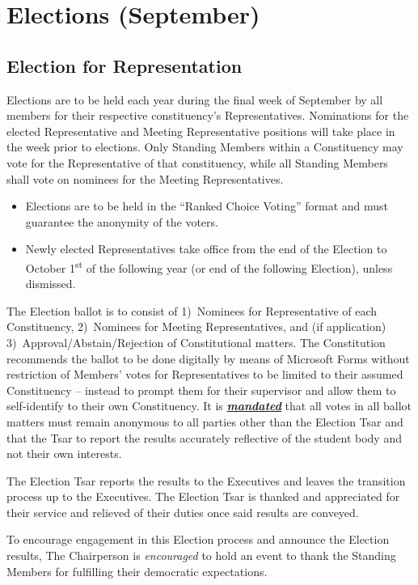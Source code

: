\documentclass[8pt]{article}
\begin{document}
	\section{Elections (September)}
	\subsection{Election for Representation}\label{sec:elections}
	Elections are to be held each year during the final week of September by all members for their respective constituency's Representatives. Nominations for the elected Representative and Meeting Representative positions will take place in the week prior to elections. Only Standing Members within a Constituency may vote for the Representative of that constituency, while all Standing Members shall vote on nominees for the Meeting Representatives. 
	\begin{itemize}	
		\item Elections are to be held in the ``Ranked Choice Voting'' format and must guarantee the anonymity of the voters. 
		\item Newly elected Representatives take office from the end of the Election to October 1\textsuperscript{st} of the following year (or end of the following Election), unless dismissed.
	\end{itemize}
	The Election ballot is to consist of 1)~Nominees for Representative of each Constituency, 2)~Nominees for Meeting Representatives, and (if application) 3)~Approval/Abstain/Rejection of Constitutional matters. The Constitution recommends the ballot to be done digitally by means of Microsoft Forms without restriction of Members' votes for Representatives to be limited to their assumed Constituency -- instead to prompt them for their supervisor and allow them to self-identify to their own Constituency. It is \textbf{\textit{\underline{mandated}}} that all votes in all ballot matters must remain anonymous to all parties other than the Election Tsar and that the Tsar to report the results accurately reflective of the student body and not their own interests.
	
	The Election Tsar reports the results to the Executives and leaves the transition process up to the Executives. The Election Tsar is thanked and appreciated for their service and relieved of their duties once said results are conveyed.
	
	To encourage engagement in this Election process and announce the Election results, The Chairperson is \textit{encouraged} to hold an event to thank the Standing Members for fulfilling their democratic expectations.
	
\end{document}
